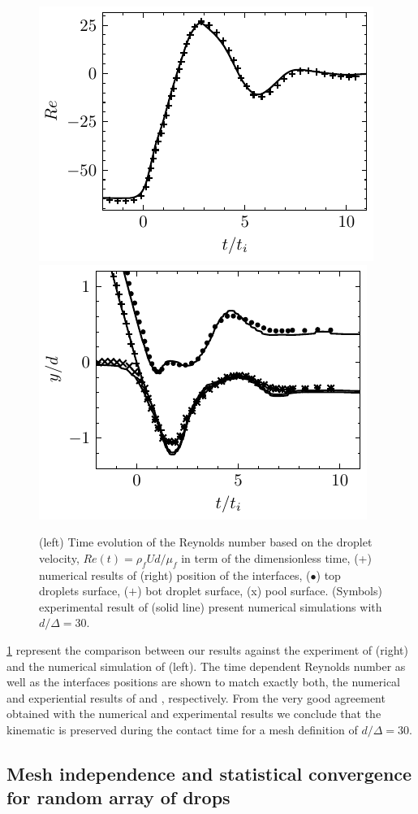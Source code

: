 \begin{figure}[h!]
    \centering
    \includegraphics[height = 0.3\textwidth]{image/VALIDATION2.0/Longmire/Re.pdf}
    \includegraphics[height = 0.3\textwidth]{image/VALIDATION2.0/Longmire/Dist.pdf}
    \caption{(left) Time evolution of the Reynolds number based on the droplet velocity, $Re(t) = \rho_fU d /\mu_f$ in term of the dimensionless time, (+) numerical results of  \citet{balcazar2015multiple} (right)  position of the interfaces, ($\bullet$) top droplets surface, ($+$) bot droplet surface, (x) pool surface. (Symbols) experimental result of \citet{mohamed2003drop} (solid line) present numerical simulations with $d/\Delta = 30$. }
    \label{fig:resultslong}
\end{figure}
\ref{fig:resultslong} represent the comparison between our results against the experiment of \citet{mohamed2003drop} (right) and the numerical simulation of \citet{balcazar2015multiple} (left). 
The time dependent Reynolds number as well as the interfaces positions are shown to match exactly both, the numerical and experiential results of \citet{balcazar2015multiple} and \citet{mohamed2003drop}, respectively. 
From the very good agreement obtained with the numerical and experimental results we conclude that the kinematic is preserved during the contact time for a mesh definition of $d/\Delta = 30$. 

\subsection*{Mesh independence and statistical convergence for random array of drops}

